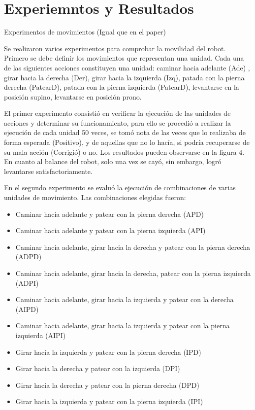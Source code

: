 \chapter{Experiemntos y Resultados}\label{chapter:resultados}


Experimentos de movimientos (Igual que en el paper)

Se realizaron varios experimentos para comprobar la movilidad del robot. Primero se debe definir los movimientos que representan una unidad. Cada una de las siguientes acciones constituyen una unidad: caminar hacia adelante (Ade) , girar hacia la derecha (Der), girar hacia la izquierda (Izq), patada con la pierna derecha (PatearD), patada con la pierna izquierda (PatearD), levantarse en la posición supino, levantarse en posición prono.

El primer experimento consistió en verificar la ejecución de las unidades de acciones y determinar su funcionamiento, para ello se procedió a realizar la ejecución de cada unidad 50 veces, se tomó nota de las veces que lo realizaba de forma esperada (Positivo), y de aquellas que no lo hacía, si podría recuperarse de su mala acción (Corrigió) o no. Los resultados pueden observarse en la figura 4. En cuanto al balance del robot,  solo una vez se cayó, sin embargo, logró levantarse satisfactoriamente.

En el segundo experimento se evalu\'o la ejecuci\'on de  combinaciones de varias unidades de movimiento. Las combinaciones elegidas fueron:

\begin{itemize}
\setlength{\itemsep}{1pt}
\item Caminar hacia adelante y patear con la pierna derecha (APD)
\item Caminar hacia adelante y patear con la pierna izquierda (API)
\item Caminar hacia adelante, girar hacia la derecha y patear con la pierna derecha (ADPD)
\item Caminar hacia adelante, girar hacia la derecha, patear con la pierna izquierda (ADPI)
\item Caminar hacia adelante, girar hacia la izquierda y patear con la derecha (AIPD)
\item Caminar hacia adelante, girar hacia la  izquierda y  patear con la pierna izquierda (AIPI)
\item Girar hacia la izquierda y patear con la pierna derecha (IPD)
\item Girar hacia la derecha y patear con la izquierda (DPI)
\item Girar hacia la derecha y patear con la pierna derecha (DPD)
\item Girar hacia la izquierda y patear con la pierna izquierda (IPI)
\end{itemize}


